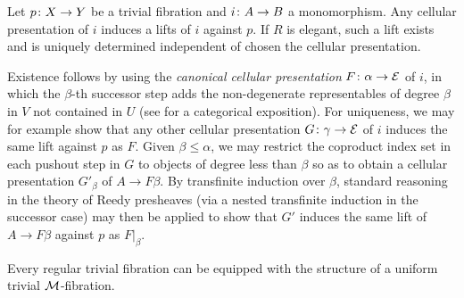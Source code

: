 \documentclass[reqno,10pt,a4paper,oneside,draft]{amsart}
\begin{document}
\begin{remark}
\label{elegant-reedy-lift-independent-of-cellular-presentation}
Let $p \co X \to Y$ be a trivial fibration and $i \co A \to B$ a monomorphism.
Any cellular presentation of $i$ induces a lifts of $i$ against $p$.
If $R$ is elegant, such a lift exists and is uniquely determined independent of chosen the cellular presentation.

Existence follows by using the \emph{canonical cellular presentation} $F \co \alpha \to \cal{E}$ of $i$, in which the $\beta$-th successor step adds the non-degenerate representables of degree $\beta$ in $V$ not contained in $U$ (see \cite{riehl-verity:reedy} for a categorical exposition).
For uniqueness, we may for example show that any other cellular presentation $G \co \gamma \to \cal{E}$ of $i$ induces the same lift against $p$ as $F$.
Given $\beta \leq \alpha$, we may restrict the coproduct index set in each pushout step in $G$ to objects of degree less than $\beta$ so as to obtain a cellular presentation $G'_\beta$ of $A \to F \beta$.
By transfinite induction over $\beta$, standard reasoning in the theory of Reedy presheaves (via a nested transfinite induction in the successor case) may then be applied to show that $G'$ induces the same lift of $A \to F \beta$ against $p$ as $F|_{\beta}$.
\end{remark}

\begin{proposition} \label{regular-trivial-fibration-to-uniform}
Every regular trivial fibration can be equipped with the structure of a uniform trivial $\cal{M}$-fibration.
\end{proposition}
\end{document}
